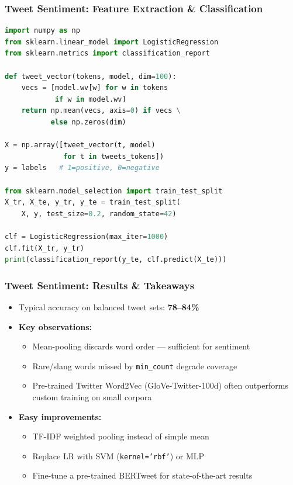 \begin{frame}[fragile]\frametitle{Tweet Sentiment: Feature Extraction \& Classification}
\begin{lstlisting}[language=Python]
import numpy as np
from sklearn.linear_model import LogisticRegression
from sklearn.metrics import classification_report

def tweet_vector(tokens, model, dim=100):
    vecs = [model.wv[w] for w in tokens
            if w in model.wv]
    return np.mean(vecs, axis=0) if vecs \
           else np.zeros(dim)

X = np.array([tweet_vector(t, model)
              for t in tweets_tokens])
y = labels   # 1=positive, 0=negative

from sklearn.model_selection import train_test_split
X_tr, X_te, y_tr, y_te = train_test_split(
    X, y, test_size=0.2, random_state=42)

clf = LogisticRegression(max_iter=1000)
clf.fit(X_tr, y_tr)
print(classification_report(y_te, clf.predict(X_te)))
\end{lstlisting}
\end{frame}

\begin{frame}[fragile]\frametitle{Tweet Sentiment: Results \& Takeaways}
\begin{itemize}
  \item Typical accuracy on balanced tweet sets: \textbf{78--84\%}
  \item \textbf{Key observations:}
  \begin{itemize}
    \item Mean-pooling discards word order --- sufficient for sentiment
    \item Rare/slang words missed by \texttt{min\_count} degrade coverage
    \item Pre-trained Twitter Word2Vec (GloVe-Twitter-100d) often outperforms custom training on small corpora
  \end{itemize}
  \item \textbf{Easy improvements:}
  \begin{itemize}
    \item TF-IDF weighted pooling instead of simple mean
    \item Replace LR with SVM (\texttt{kernel='rbf'}) or MLP
    \item Fine-tune a pre-trained BERTweet for state-of-the-art results
  \end{itemize}
\end{itemize}
\end{frame}


